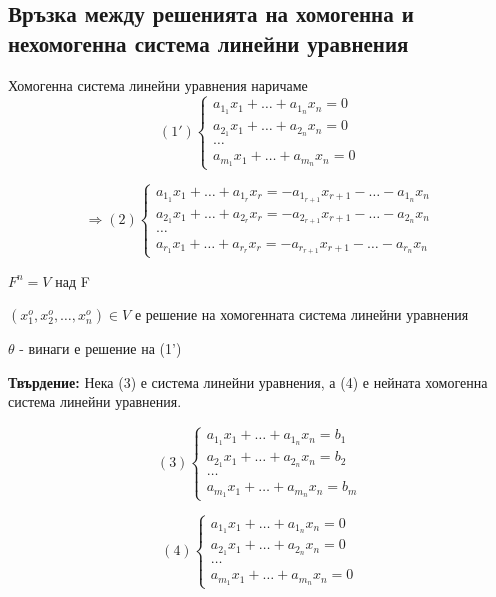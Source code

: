 \documentclass[fleqn,12pt]{article}
\begin{document}
\begin{flushleft}
\subsection{Връзка между решенията на хомогенна и нехомогенна система линейни уравнения}
Хомогенна система линейни уравнения наричаме
\begin{equation*}
    (1')\begin{cases}
        a_{1_1}x_1+\dots+a_{1_n}x_n = 0\\
        a_{2_1}x_1+\dots+a_{2_n}x_n = 0\\
        \dots\\
        a_{m_1}x_1+\dots+a_{m_n}x_n = 0
    \end{cases}
\end{equation*}

\begin{equation*}
    \Rightarrow(2)\begin{cases}
        a_{1_1}x_1+\dots+a_{1_r}x_r = - a_{1_{r+1}}x_{r+1} - \dots - a_{1_n}x_n\\
        a_{2_1}x_1+\dots+a_{2_r}x_r = - a_{2_{r+1}}x_{r+1} - \dots - a_{2_n}x_n\\
        \dots\\
        a_{r_1}x_1+\dots+a_{r_r}x_r = - a_{r_{r+1}}x_{r+1} - \dots - a_{r_n}x_n
    \end{cases}
\end{equation*}

$ F^n = V $ над F

$ ( x_1^o, x_2^o, \dots, x_n^o ) \in V $ е решение на хомогенната система линейни уравнения

$ \theta $ - винаги е решение на (1')

\vspace{5mm}

\textbf{Твърдение: } Нека (3) е система линейни уравнения, а (4) е нейната хомогенна система линейни уравнения.


\begin{equation*}
    (3)\begin{cases}
        a_{1_1}x_1+\dots+a_{1_n}x_n = b_1\\
        a_{2_1}x_1+\dots+a_{2_n}x_n = b_2\\
        \dots\\
        a_{m_1}x_1+\dots+a_{m_n}x_n = b_m
    \end{cases}
\end{equation*}

\begin{equation*}
    (4)\begin{cases}
        a_{1_1}x_1+\dots+a_{1_n}x_n = 0\\
        a_{2_1}x_1+\dots+a_{2_n}x_n = 0\\
        \dots\\
        a_{m_1}x_1+\dots+a_{m_n}x_n = 0
    \end{cases}
\end{equation*}


\end{flushleft}
\end{document}
